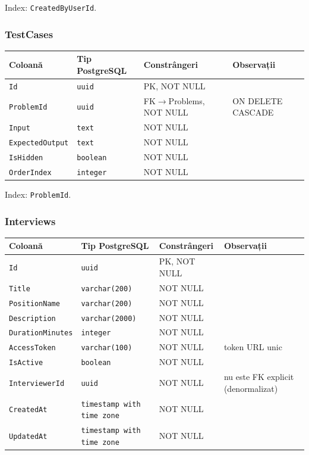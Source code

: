 \medskip
Index: \texttt{CreatedByUserId}.

\subsubsection{TestCases}

\begin{tabular}{llll}
\hline
\textbf{Coloană} & \textbf{Tip PostgreSQL} & \textbf{Constrângeri} & \textbf{Observații} \\
\hline
\texttt{Id}             & \texttt{uuid}    & PK, NOT NULL                 & \\
\texttt{ProblemId}      & \texttt{uuid}    & FK$\rightarrow$Problems, NOT NULL        & ON DELETE CASCADE \\
\texttt{Input}          & \texttt{text}    & NOT NULL                     & \\
\texttt{ExpectedOutput} & \texttt{text}    & NOT NULL                     & \\
\texttt{IsHidden}       & \texttt{boolean} & NOT NULL                     & \\
\texttt{OrderIndex}     & \texttt{integer} & NOT NULL                     & \\
\hline
\end{tabular}

\medskip
Index: \texttt{ProblemId}.

\subsubsection{Interviews}

\begin{tabular}{llll}
\hline
\textbf{Coloană} & \textbf{Tip PostgreSQL} & \textbf{Constrângeri} & \textbf{Observații} \\
\hline
\texttt{Id}              & \texttt{uuid}           & PK, NOT NULL  & \\
\texttt{Title}           & \texttt{varchar(200)}   & NOT NULL      & \\
\texttt{PositionName}    & \texttt{varchar(200)}   & NOT NULL      & \\
\texttt{Description}     & \texttt{varchar(2000)}  & NOT NULL      & \\
\texttt{DurationMinutes} & \texttt{integer}        & NOT NULL      & \\
\texttt{AccessToken}     & \texttt{varchar(100)}   & NOT NULL      & token URL unic \\
\texttt{IsActive}        & \texttt{boolean}        & NOT NULL      & \\
\texttt{InterviewerId}   & \texttt{uuid}           & NOT NULL      & nu este FK explicit (denormalizat) \\
\texttt{CreatedAt}       & \texttt{timestamp with time zone} & NOT NULL & \\
\texttt{UpdatedAt}       & \texttt{timestamp with time zone} & NOT NULL & \\
\hline
\end{tabular}

